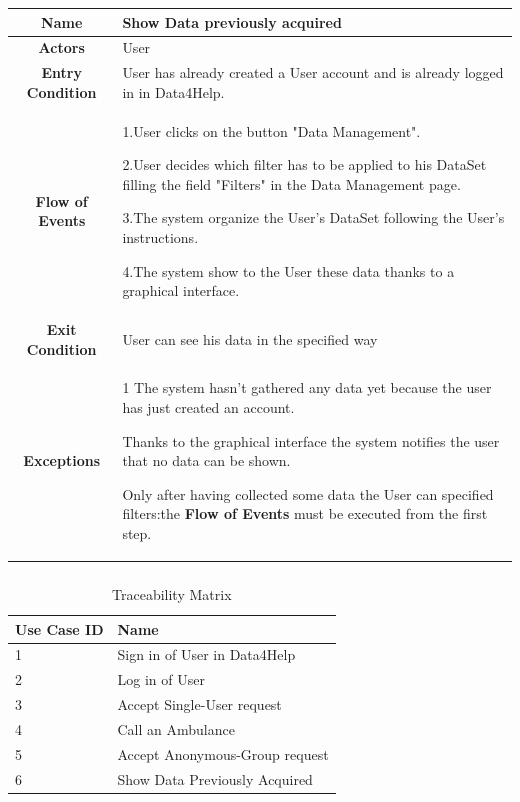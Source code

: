      \begin{table}[h!]
        \centering
        \begin{tabularx}{\linewidth}{|c|X|}
          \hline
          \textbf{Name} & Show Data previously acquired\\
        	\hline
        	\textbf{Actors} & User\\
        	\hline
        	\textbf{Entry Condition} & User has already created a User account and is already logged in in Data4Help.\\
        	\hline
        	\textbf{Flow of Events} &
        					1.User clicks on the button "Data Management".

        					2.User decides which filter has to be applied to his DataSet filling the field "Filters" in the Data 						Management page.

        					3.The system organize the User's DataSet following the User's instructions.

        					4.The system show to the User these data thanks to a graphical interface. \\
        	\hline
        	\textbf{Exit Condition} & User can see his data in the specified way\\

        	\hline
        	\textbf{Exceptions} & 1 The system hasn't gathered any data yet because the user has just created an account.

        				Thanks to the graphical interface the system notifies the user that no data can be shown.

        				Only after having collected some data the User can specified filters:the \textbf{Flow of Events} must be 				executed from the first step.\\

          \hline
        \end{tabularx}
      \end{table}

    \subsubsection{}

      \begin{table}[h!]
        \centering
        \begin{tabularx}{\linewidth}{|X|X|}
          \hline
          \textbf{Use Case ID} & \textbf{Name}  \\
        	\hline
        	1 & Sign in of User in Data4Help\\
        	\hline
        	2 & Log in of User\\
        	\hline
        	3 & Accept Single-User request\\
        	\hline
        	4 & Call an Ambulance\\
        	\hline
        	5 & Accept Anonymous-Group request\\
        	\hline
        	6 & Show Data Previously Acquired\\
          \hline
  	    \end{tabularx}
        \caption{Traceability Matrix}
      \end{table}

